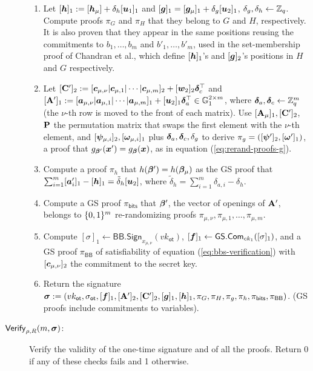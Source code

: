 \begin{description}
\begin{enumerate}
\item Let $[{\boldsymbol{h}}]_1:=[{\boldsymbol{h}}_\mu]+\delta_h[{\boldsymbol{u}}_1]_1$ and $[{\boldsymbol{g}}]_1=[{\boldsymbol{g}}_\mu]_1+\delta_g[{\boldsymbol{u}}_2]_1$, $\delta_g,\delta_h\gets\mathbb{Z}_q$. Compute proofs $\pi_G$ and $\pi_H$ that they belong to $G$ and $H$, respectively. It is also proven that they appear in the same positions reusing the commitments to $b_1,\ldots,b_{m}$ and $b'_1,\ldots,b'_{m}$, used in the set-membership proof of Chandran et al., which define $[{\boldsymbol{h}}]_1$'s and $[{\boldsymbol{g}}]_2$'s positions in $H$ and $G$ respectively.

\item Let
$
[\mathbf{{C}}']_2:=[{\boldsymbol{c}}_{\mu,\nu}|{\boldsymbol{c}}_{\mu,1}|\cdots|{\boldsymbol{c}}_{\mu,m}]_2+[{\boldsymbol{w}}_2]_2{\boldsymbol{\delta}}_c^\top$ and $[\mathbf{{A}}']_1:=[{\boldsymbol{a}}_{\mu,\nu} |\allowbreak {\boldsymbol{a}}_{\mu,1} | \cdots |\allowbreak{\boldsymbol{a}}_{\mu,m}]_1+[{\boldsymbol{u}}_2]_1{\boldsymbol{\delta}}_a^\top\in\mathbb{G}^{2\times m}_1$, where ${\boldsymbol{\delta}}_a,{\boldsymbol{\delta}}_c\gets\mathbb{Z}_q^m$ (the $\nu$-th row is moved to the front of each matrix).
Use $[\mathbf{{A}}_\mu]_1,[\mathbf{{C}}']_2$, $\mathbf{{P}}$ the permutation matrix that swaps the first element with the $\nu$-th element, and $[{\boldsymbol{\psi}}_{\mu,i}]_2,[{\boldsymbol{\omega}}_{\mu,i}]_1$ plus ${\boldsymbol{\delta}}_a,{\boldsymbol{\delta}}_c,\delta_g$ to derive $\pi_g = ([{\boldsymbol{\psi}}']_2,[{\boldsymbol{\omega}}']_1)$, a proof that $g_{{\boldsymbol{\beta}}'}({\boldsymbol{x}}')=g_{\boldsymbol{\beta}}({\boldsymbol{x}})$, as in equation (\ref{eq:rerand-proofs-g}).
\item Compute a proof $\pi_h$ that $h({\boldsymbol{\beta}}')=h({\boldsymbol{\beta}}_\mu)$ as the GS proof that $\sum_{i=1}^m [{\boldsymbol{a}}'_i]_1-[{\boldsymbol{h}}]_1 = \tilde{\delta}_h[{\boldsymbol{u}}_2]$, where $\tilde{\delta}_h = \sum_{i=1}^m\delta_{a,i}-\delta_h$.
\item Compute a GS proof $\pi_\mathsf{bits}$ that ${\boldsymbol{\beta}}'$, the vector of openings of  $\mathbf{{A}}'$, belongs to $\{0,1\}^m$ re-randomizing proofs $\pi_{\mu,\nu},\pi_{\mu,1},\allowbreak\ldots,\pi_{\mu,m}$.

\item Compute $[\sigma]_1\gets\mathsf{BB}.\mathsf{Sign}_{x_{\mu,\nu}}(vk_\mathsf{ot})$, $[{\boldsymbol{f}}]_1\gets{\mathsf{GS}}.\mathsf{Com}_{ck_1}([\sigma]_1)$, and a GS proof $\pi_\mathsf{BB}$ of satisfiability of equation (\ref{eq:bbs-verification}) with $[{\boldsymbol{c}}_{\mu,\nu}]_2$ the commitment to the secret key.

\item Return the signature ${\boldsymbol \sigma}:=(vk_\mathsf{ot},\sigma_\mathsf{ot},[{\boldsymbol{f}}]_1,[\mathbf{{A}}']_2,[\mathbf{{C}}']_2,[{\boldsymbol{g}}]_1,[{\boldsymbol{h}}]_1,\allowbreak\pi_G,\pi_H, \pi_g,\allowbreak \pi_h,\pi_{\mathsf{bits}},\pi_\mathsf{BB})$. (GS proofs include commitments to variables).
\end{enumerate}

\item[$\mathsf{Verify}_{\rho,R}(m,{\boldsymbol \sigma})$:] Verify the validity of the one-time signature and of all the proofs. Return 0 if any of these checks fails and 1 otherwise.
\end{description}

